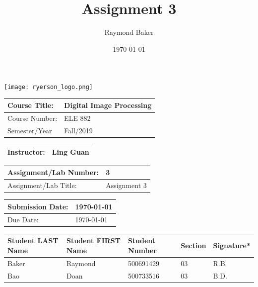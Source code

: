\documentclass[
]{article}
\date{}
\begin{document}
\title{Assignment 3}
\author{Raymond Baker}
\date{\today}

\texttt{[image: ryerson\_logo.png]}

\begin{flushleft}
\begin{tabular}{|p{}|p{}|} 
 \hline
    Course Title: & Digital Image Processing \\ [5ex]
 \hline
    Course Number: & ELE 882 \\ [5ex]
 \hline
    Semester/Year & Fall/2019 \\ [5ex]
 \hline

\end{tabular}
\end{flushleft}

\begin{flushleft}
\begin{tabular}{|p{}|p{}|} 
 \hline
    Instructor: & Ling Guan \\ [5ex]
 \hline
\end{tabular}
\end{flushleft}

\begin{flushleft}
\begin{tabular}{|p{}|p{}|} 
 \hline
    Assignment/Lab Number: & 3 \\[5ex]
 \hline
    Assignment/Lab Title: & Assignment 3 \\[5ex]
 \hline
\end{tabular}
\end{flushleft}

\begin{flushleft}
\begin{tabular}{|p{}|p{}|} 
 \hline
    Submission Date: & \today \\[5ex]
 \hline
    Due Date: & \today \\[5ex]
 \hline
\end{tabular}
\end{flushleft}

\begin{flushleft}
\begin{tabular}{|p{}|p{}|p{}|p{}|p{}|}
 \hline
     Student \linebreak LAST Name & Student \linebreak FIRST Name & Student \linebreak Number & Section & Signature* \\
 \hline
    Baker & Raymond & 500691429 & 03 & R.B. \\[5ex]
 \hline
    Bao & Doan & 500733516 & 03 & B.D. \\[5ex]
 \hline
\end{tabular}
\end{flushleft}
\end{document}
